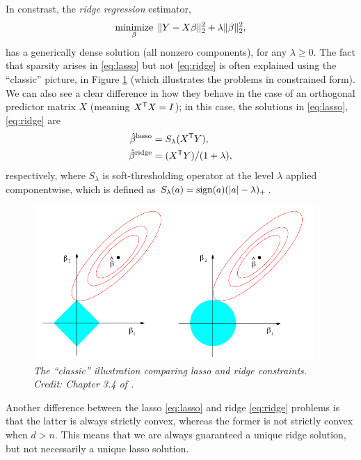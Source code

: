 \documentclass{article}
\begin{document}
In constrast, the \emph{ridge regression} estimator, 
\begin{equation}
\label{eq:ridge}
\mathop{\mathrm{minimize}}_\beta \; \|Y - X\beta\|_2^2 + \lambda \|\beta\|_2^2, 
\end{equation}
has a generically dense solution (all nonzero components), for any $\lambda \geq
0$. The fact that sparsity arises in \eqref{eq:lasso} but not \eqref{eq:ridge}
is often explained using the ``classic'' picture, in Figure
\ref{fig:lasso_ridge} (which illustrates the problems in constrained form). We
can also see a clear difference in how they behave in the case of an orthogonal
predictor matrix $X$ (meaning $X^{\mathsf{T}} X = I$); in this case, the solutions in
\eqref{eq:lasso}, \eqref{eq:ridge} are 
\begin{align*}
\hat{\beta}^{\text{lasso}} &= S_\lambda(X^{\mathsf{T}} Y), \\
\hat{\beta}^{\text{ridge}} &= (X^{\mathsf{T}} Y) / (1+\lambda),
\end{align*}
respectively, where $S_\lambda$ is soft-thresholding operator at the level
$\lambda$ applied componentwise, which is defined as $S_\lambda(a) = \mathrm{sign}(a)
(|a| - \lambda)_+$.  

\begin{figure}[htb]
\centering
\includegraphics[width=0.95\textwidth]{lasso_ridge.pdf}
\caption{\it The ``classic'' illustration comparing lasso and ridge
  constraints. Credit: Chapter 3.4 of \citet{hastie2009elements}.}  
\label{fig:lasso_ridge}
\end{figure}

Another difference between the lasso \eqref{eq:lasso} and ridge \eqref{eq:ridge}
problems is that the latter is always strictly convex, whereas the former is not
strictly convex when $d>n$. This means that we are always guaranteed a unique
ridge solution, but not necessarily a unique lasso solution.   
\end{document}
